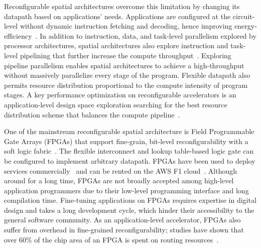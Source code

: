 Reconfigurable spatial architectures overcome this limitation by changing its datapath based on applications' needs.
Applications are configured at the circuit-level without dynamic instruction fetching and decoding,
hence improving energy-efficiency~\cite{calhoun,fpgaPower}.
In addition to instruction, data, and task-level parallelism explored by processor architectures, spatial architectures also explore instruction and task-level
pipelining that further increase the compute throughput~\cite{spatial-computation}.
Exploring pipeline parallelism enables spatial architectures to achieve a high-throughput
without massively parallelize every stage of the program.
Flexible datapath also permits resource distribution proportional to the compute intensity of
program stages.
A key performance optimization on reconfigurable accelerators is an application-level design space
exploration 
searching for the best resource distribution scheme that balances the compute pipeline~\cite{dse_koeplinger}.

One of the mainstream reconfigurable spatial architecture is 
Field Programmable Gate Arrays (FPGAs) that support fine-grain, 
bit-level reconfigurability with a soft logic fabric~\cite{fpga-survey}.
The flexible interconnect and lookup table-based logic gate can be configured to implement arbitrary
datapath.
FPGAs have been used to deploy services commercially~\cite{microsoft, baidu, deephi} and can be rented on the AWS F1 cloud~\cite{aws}. 
Although around for a long time, FPGAs are not broadly accepted among high-level application programmers due to their low-level programming interface and long compilation time.
Fine-tuning applications on FPGAs requires expertise in digital design and takes a long development cycle, which hinder their accessibility to the general software community.
As an application-level accelerator, FPGAs also suffer from overhead in fine-grained reconfigurability; 
studies have shown that over 60\% of the chip area of an FPGA is spent on routing resources~\cite{fpgaSurvey, calhoun, fpgaPower}. 


